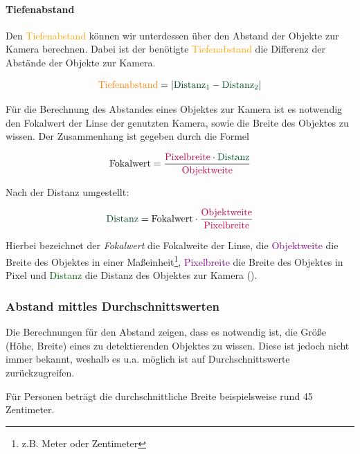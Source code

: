 \documentclass[12pt]{article}
\theoremstyle{definition}
\begin{document}
\paragraph{Tiefenabstand}
\begin{flushleft}
Den \textcolor{orange}{Tiefenabstand} können wir unterdessen über den Abstand der Objekte zur Kamera berechnen. Dabei ist der benötigte \textcolor{orange}{Tiefenabstand} die Differenz der Abstände der Objekte zur Kamera.

\begin{equation}
\text{\textcolor{orange}{Tiefenabstand}} = | \text{\textcolor{darkgreen}{Distanz}}_{\textcolor{darkgreen}{1}} - \text{\textcolor{darkgreen}{Distanz}}_{\textcolor{darkgreen}{2}} |
\end{equation}

Für die Berechnung des Abstandes eines Objektes zur Kamera ist es notwendig den Fokalwert der Linse der genutzten Kamera, sowie die Breite des Objektes zu wissen. Der Zusammenhang ist gegeben durch die Formel

\begin{equation}\label{eq:foc}
\text{Fokalwert} = \frac{\text{\textcolor{purple}{Pixelbreite}} \cdot \text{\textcolor{darkgreen}{Distanz}}}{\text{\textcolor{purple}{Objektweite}}}
\end{equation}

Nach der Distanz umgestellt:

\begin{equation}
\text{\textcolor{darkgreen}{Distanz}} = \text{Fokalwert} \cdot \frac{\text{\textcolor{purple}{Objektweite}}}{\text{\textcolor{purple}{Pixelbreite}}}
\end{equation}

Hierbei bezeichnet der \textit{Fokalwert} die Fokalweite der Linse, die \textcolor{purple}{Objektweite} die Breite des Objektes in einer Maßeinheit\footnote{z.B. Meter oder Zentimeter}, \textcolor{purple}{Pixelbreite} die Breite des Objektes in Pixel und \textcolor{darkgreen}{Distanz} die Distanz des Objektes zur Kamera (\cite{dist-cam-obj}).
\end{flushleft}

\subsubsection{Abstand mittles Durchschnittswerten}
\begin{flushleft}
Die Berechnungen für den Abstand zeigen, dass es notwendig ist, die Größe (Höhe, Breite) eines zu detektierenden Objektes zu wissen. Diese ist jedoch nicht immer bekannt, weshalb es u.a. möglich ist auf Durchschnittswerte zurückzugreifen.

Für Personen beträgt die durchschnittliche Breite beispielsweise rund 45 Zentimeter.
\end{flushleft}
\end{document}
